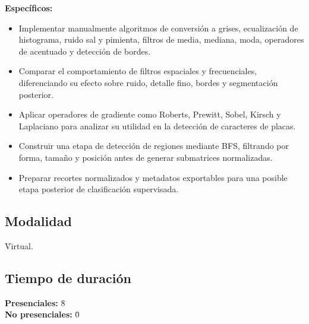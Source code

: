 \documentclass[11pt]{article}
\begin{document}
\textbf{Específicos:}
\begin{itemize}
    \item Implementar manualmente algoritmos de conversión a grises, ecualización de histograma, ruido sal y pimienta, filtros de media, mediana, moda, operadores de acentuado y detección de bordes.
    \item Comparar el comportamiento de filtros espaciales y frecuenciales, diferenciando su efecto sobre ruido, detalle fino, bordes y segmentación posterior.
    \item Aplicar operadores de gradiente como Roberts, Prewitt, Sobel, Kirsch y Laplaciano para analizar su utilidad en la detección de caracteres de placas.
    \item Construir una etapa de detección de regiones mediante BFS, filtrando por forma, tamaño y posición antes de generar submatrices normalizadas.
    \item Preparar recortes normalizados y metadatos exportables para una posible etapa posterior de clasificación supervisada.
\end{itemize}

\subsection{Modalidad}
\begin{tabbing}
    \hspace{1cm} \= Virtual.
\end{tabbing}

\subsection{Tiempo de duración}
\begin{tabbing}
    \hspace{1cm} \= \textbf{Presenciales:} \= 8 \\
    \hspace{1cm} \= \textbf{No presenciales:} \= 0
\end{tabbing}
\end{document}
